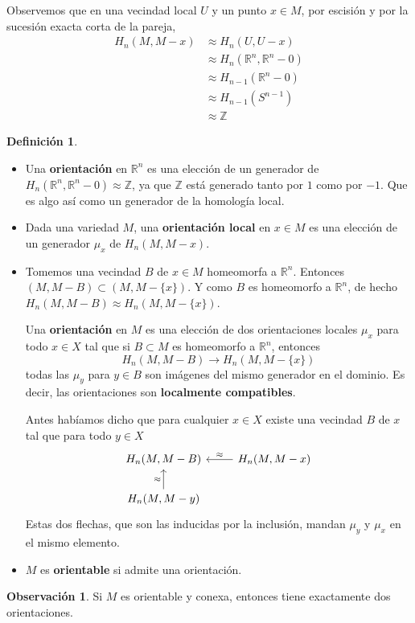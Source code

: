 \documentclass[spanish]{book}
\theoremstyle{definition}
\newtheorem*{defn}{Definición}
\newtheorem*{obs}{Observación}
\newcommand{\R}{\mathbb{R}}
\newcommand{\Z}{\mathbb{Z}}
\begin{document}
Observemos que en una vecindad local $U$ y un punto $x\in M$, por escisión y por la sucesión exacta corta de la pareja,
\begin{align*}
	H_n(M,M-x)&\approx H_n(U,U-x)\\
	&\approx H_n(\R^n,\R^n-0)\\
	&\approx H_{n-1}(\R^n-0)\\
	&\approx H_{n-1}(S^{n-1})\\
	&\approx\Z
\end{align*}
\begin{defn}\leavevmode
\begin{itemize}
	\item 	Una \textbf{orientación} en $\R^n$ es una elección de un generador de $H_n(\R^n,\R^n-0)\approx\Z$, ya que $\Z$ está generado tanto por $1$ como por $-1$. Que es algo así como un generador de la homología local.
	
	\item Dada una variedad $M$, una \textbf{orientación local} en $x\in M$ es una elección de un generador $\mu_x$ de $H_n(M,M-x)$.
	
	\item Tomemos una vecindad $B$ de $x\in M$ homeomorfa a $\R^n$. Entonces $(M,M-B)\subset (M,M-\{x\})$. Y como $B$ es homeomorfo a $\R^n$, de hecho $H_n(M,M-B)\approx H_n(M,M-\{x\})$.
	
	Una \textbf{orientación} en $M$ es una elección de dos orientaciones locales $\mu_x$ para todo $x\in X$ tal que si $B\subset M$ es homeomorfo a $\R^n$, entonces
	\[H_n(M,M-B)\to H_n(M,M-\{x\})\]
	todas las $\mu_y$ para $y\in B$ son imágenes del mismo generador en el dominio. Es decir, las orientaciones son \textbf{localmente compatibles}.
	
	Antes habíamos dicho que para cualquier $x\in X$ existe una vecindad $B$ de $x$ tal que para todo $y\in X$
		\[\begin{tikzcd}
			H_n(M,M-B)&H_n(M,M-x)\arrow[l,swap,"\approx"]\\
			H_n(M,M-y)\arrow[u,"\approx"]
		\end{tikzcd}\]
	Estas dos flechas, que son las inducidas por la inclusión, mandan $\mu_y$ y $\mu_x$ en el mismo elemento.
	
	\item $M$ es \textbf{orientable} si admite una orientación.
\end{itemize}
\end{defn}

\begin{obs}
	Si $M$ es orientable y conexa, entonces tiene exactamente dos orientaciones.
\end{obs}
\end{document}
